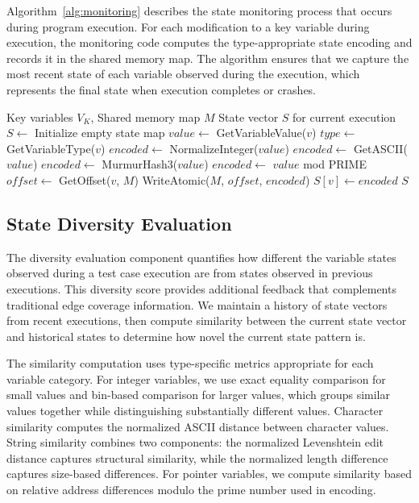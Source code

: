 \documentclass[review]{elsarticle}
\begin{document}
Algorithm~\ref{alg:monitoring} describes the state monitoring process that occurs during program execution. For each modification to a key variable during execution, the monitoring code computes the type-appropriate state encoding and records it in the shared memory map. The algorithm ensures that we capture the most recent state of each variable observed during the execution, which represents the final state when execution completes or crashes.

\begin{algorithm}[t]
\caption{Runtime Variable State Monitoring}
\label{alg:monitoring}
\begin{algorithmic}[1]
\REQUIRE Key variables $V_K$, Shared memory map $M$
\ENSURE State vector $S$ for current execution
\STATE $S \leftarrow$ Initialize empty state map
        \STATE $value \leftarrow$ GetVariableValue($v$)
        \STATE $type \leftarrow$ GetVariableType($v$)
            \STATE $encoded \leftarrow$ NormalizeInteger($value$)
            \STATE $encoded \leftarrow$ GetASCII($value$)
            \STATE $encoded \leftarrow$ MurmurHash3($value$)
            \STATE $encoded \leftarrow$ $value$ mod PRIME
        \ENDIF
        \STATE $offset \leftarrow$ GetOffset($v$, $M$)
        \STATE WriteAtomic($M$, $offset$, $encoded$)
        \STATE $S[v] \leftarrow encoded$
    \ENDIF
\ENDFOR
\RETURN $S$
\end{algorithmic}
\end{algorithm}

\subsection{State Diversity Evaluation}

The diversity evaluation component quantifies how different the variable states observed during a test case execution are from states observed in previous executions. This diversity score provides additional feedback that complements traditional edge coverage information. We maintain a history of state vectors from recent executions, then compute similarity between the current state vector and historical states to determine how novel the current state pattern is.

The similarity computation uses type-specific metrics appropriate for each variable category. For integer variables, we use exact equality comparison for small values and bin-based comparison for larger values, which groups similar values together while distinguishing substantially different values. Character similarity computes the normalized ASCII distance between character values. String similarity combines two components: the normalized Levenshtein edit distance captures structural similarity, while the normalized length difference captures size-based differences. For pointer variables, we compute similarity based on relative address differences modulo the prime number used in encoding.
\end{document}
